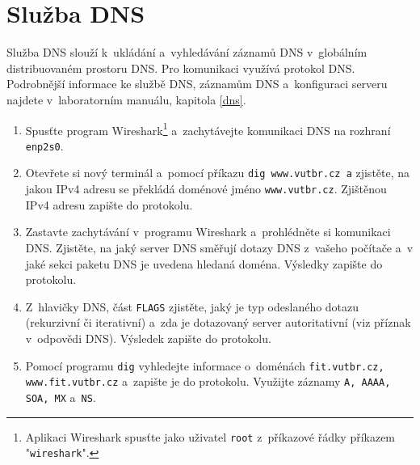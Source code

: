 \documentclass[a4paper,11pt]{article}
\begin{document}
\section{Služba DNS}
Služba DNS slouží k~ukládání a~vyhledávání záznamů DNS v~globálním distribuovaném prostoru DNS. Pro komunikaci využívá protokol DNS. Podrobnější informace ke službě DNS, záznamům DNS a~konfiguraci serveru najdete v~laboratorním manuálu, kapitola \ref{dns}.
\begin{enumerate}
    \item Spusťte program Wireshark\footnote{Aplikaci Wireshark spusťte jako uživatel \texttt{root} z~příkazové řádky příkazem "\texttt{wireshark}".} a~zachytávejte komunikaci DNS na rozhraní \texttt{enp2s0}.
    \item Otevřete si nový terminál a~pomocí příkazu \texttt{dig www.vutbr.cz a} zjistěte, na jakou IPv4 adresu se překládá doménové jméno \texttt{www.vutbr.cz}. Zjištěnou IPv4 adresu zapište do protokolu.
    \item Zastavte zachytávání v~programu Wireshark a~prohlédněte si komunikaci DNS. Zjistěte, na jaký server DNS směřují dotazy DNS z~vašeho počítače a~v jaké sekci paketu DNS je uvedena hledaná doména. Výsledky zapište do protokolu.
    \item Z~hlavičky DNS, část \texttt{FLAGS} zjistěte, jaký je typ odeslaného dotazu (rekurzivní či iterativní) a~zda je dotazovaný server autoritativní (viz příznak v~odpovědi DNS). Výsledek zapište do protokolu.
    \item Pomocí programu {\tt dig} vyhledejte informace o~doménách {\tt fit.vutbr.cz, www.fit.vutbr.cz} a~zapište je do protokolu. Využijte záznamy \texttt{A, AAAA, SOA, MX} a~{\tt NS}.
\end{enumerate}

\end{document}

